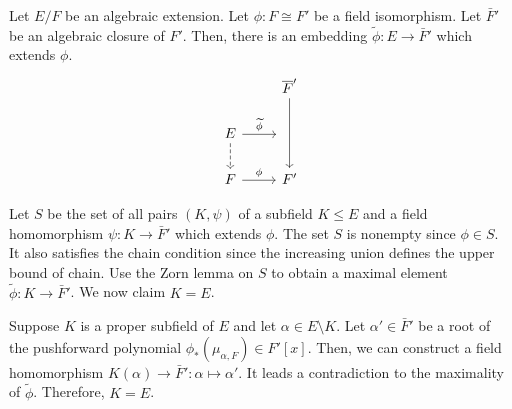 \documentclass{../../large}
\begin{document}
\begin{prb}
Let $E/F$ be an algebraic extension.
Let $\phi:F\cong F'$ be a field isomorphism.
Let $\bar F'$ be an algebraic closure of $F'$.
Then, there is an embedding $\tilde\phi:E\to\bar F'$ which extends $\phi$.
\[\begin{tikzcd}
&\bar F' \ar{dd}\\
E\ar{r}{\tilde\phi}\dar[dashed]&\quad\\
F\ar{r}{\phi}&F'
\end{tikzcd}\]
\end{prb}
\begin{pf}
Let $S$ be the set of all pairs $(K,\psi)$ of a subfield $K\le E$ and a field homomorphism $\psi:K\to\bar F'$ which extends $\phi$.
The set $S$ is nonempty since $\phi\in S$.
It also satisfies the chain condition since the increasing union defines the upper bound of chain.
Use the Zorn lemma on $S$ to obtain a maximal element $\tilde\phi:K\to\bar F'$.
We now claim $K=E$.

Suppose $K$ is a proper subfield of $E$ and let $\alpha\in E\setminus K$.
Let $\alpha'\in\bar F'$ be a root of the pushforward polynomial $\phi_*(\mu_{\alpha,F})\in F'[x]$.
Then, we can construct a field homomorphism $K(\alpha)\to\bar F':\alpha\mapsto\alpha'$.
It leads a contradiction to the maximality of $\tilde\phi$.
Therefore, $K=E$.
\end{pf}
\end{document}
